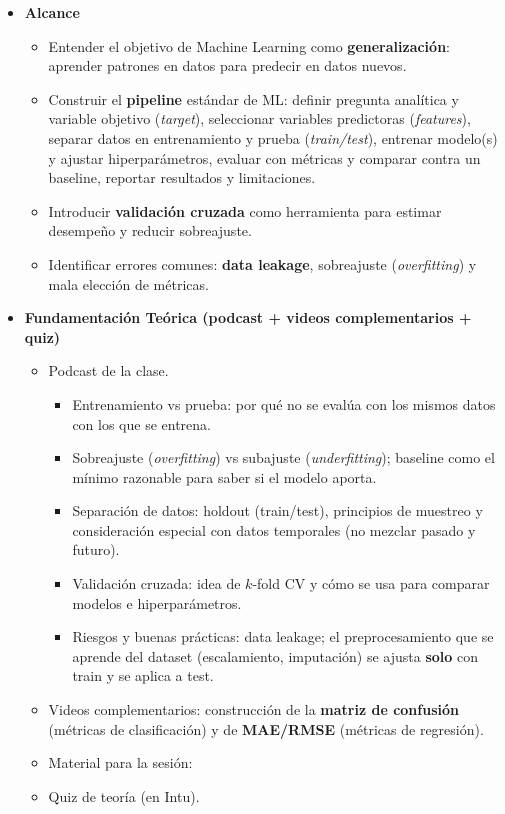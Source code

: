 \documentclass{article}
\begin{document}
\begin{itemize}
\item \textbf{Alcance}
\begin{itemize}
  \item Entender el objetivo de Machine Learning como \textbf{generalización}: aprender patrones en datos para predecir en datos nuevos.
  \item Construir el \textbf{pipeline} estándar de ML: definir pregunta analítica y variable objetivo (\textit{target}), seleccionar variables predictoras (\textit{features}), separar datos en entrenamiento y prueba (\textit{train/test}), entrenar modelo(s) y ajustar hiperparámetros, evaluar con métricas y comparar contra un baseline, reportar resultados y limitaciones.
  \item Introducir \textbf{validación cruzada} como herramienta para estimar desempeño y reducir sobreajuste.
  \item Identificar errores comunes: \textbf{data leakage}, sobreajuste (\textit{overfitting}) y mala elección de métricas.
\end{itemize}

\item \textbf{Fundamentación Teórica (podcast + videos complementarios + quiz)}
\begin{itemize}
  \item Podcast de la clase. %
  \begin{itemize}
    \item Entrenamiento vs prueba: por qué no se evalúa con los mismos datos con los que se entrena.
    \item Sobreajuste (\textit{overfitting}) vs subajuste (\textit{underfitting}); baseline como el mínimo razonable para saber si el modelo aporta.
    \item Separación de datos: holdout (train/test), principios de muestreo y consideración especial con datos temporales (no mezclar pasado y futuro).
    \item Validación cruzada: idea de $k$-fold CV y cómo se usa para comparar modelos e hiperparámetros.
    \item Riesgos y buenas prácticas: data leakage; el preprocesamiento que se aprende del dataset (escalamiento, imputación) se ajusta \textbf{solo} con train y se aplica a test.
  \end{itemize}
  \item Videos complementarios: construcción de la \textbf{matriz de confusión} (métricas de clasificación) y de \textbf{MAE/RMSE} (métricas de regresión). %
  \item Material para la sesión: %
  \item Quiz de teoría (en Intu).
\end{itemize}


\end{itemize}
\end{document}
